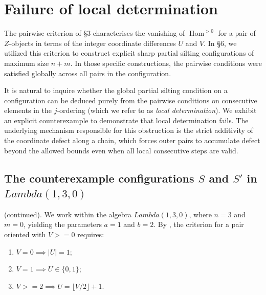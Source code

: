 \documentclass[11pt, a4paper]{article}
\theoremstyle{definition}
\def\Lambda{Lambda}%
\def\ge{>=}%
\def\mathcal#1{#1}%
\begin{document}

\section{Failure of local determination}
\label{sec:notlocal}

The pairwise criterion of \S 3 characterises the vanishing of $\operatorname{Hom}^{>0}$ for a pair of $\mathcal Z$-objects in terms of the integer coordinate differences $U$ and $V$. In \S 6, we utilized this criterion to construct explicit sharp partial silting configurations of maximum size $n+m$. In those specific constructions, the pairwise conditions were satisfied globally across all pairs in the configuration.

It is natural to inquire whether the global partial silting condition on a configuration can be deduced purely from the pairwise conditions on consecutive elements in the $j$-ordering (which we refer to as \emph{local determination}). We exhibit an explicit counterexample to demonstrate that local determination fails. The underlying mechanism responsible for this obstruction is the strict additivity of the coordinate defect along a chain, which forces outer pairs to accumulate defect beyond the allowed bounds even when all local consecutive steps are valid.

\subsection{The counterexample configurations \texorpdfstring{$S$}{S} and \texorpdfstring{$S'$}{S'} in \texorpdfstring{$\Lambda(1,3,0)$}{Lambda(1,3,0)}}\label{subsec:notlocal-config}

 (continued). We work within the algebra $\Lambda(1,3,0)$, where $n=3$ and $m=0$, yielding the parameters $a=1$ and $b=2$. By , the criterion for a pair oriented with $V \ge 0$ requires:
\begin{enumerate}
  \item[\textup{(A)}] $V=0 \implies |U|=1$;
  \item[\textup{(B1)}] $V=1 \implies U \in \{0,1\}$;
  \item[\textup{(B2)}] $V \ge 2 \implies U = \lfloor V/2\rfloor + 1$.
\end{enumerate}
\end{document}
